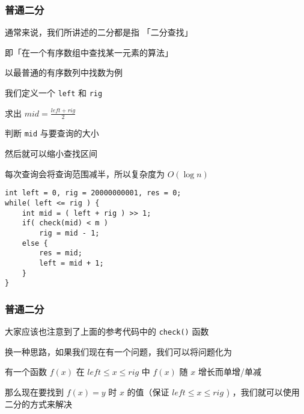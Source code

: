 \documentclass[10pt]{beamer}
\begin{document}
	\begin{frame}[fragile]
		\frametitle{普通二分}
		通常来说，我们所讲述的二分都是指 「二分查找」

		即「在一个有序数组中查找某一元素的算法」

		\pause

		以最普通的有序数列中找数为例

		我们定义一个 \texttt{left} 和 \texttt{rig}

		求出 $ mid = \frac{left + rig}{2} $

		\pause

		判断 \texttt{mid} 与要查询的大小

		然后就可以缩小查找区间

		每次查询会将查询范围减半，所以复杂度为 $O(\log n)$

		\pause

		\begin{lstlisting}[title=参考代码, frame=shadowbox]
int left = 0, rig = 20000000001, res = 0;
while( left <= rig ) {
    int mid = ( left + rig ) >> 1;
    if( check(mid) < m )
        rig = mid - 1;
    else {
        res = mid;
        left = mid + 1;
    }
}\end{lstlisting}
	\end{frame}
	\begin{frame}
		\frametitle{普通二分}
		大家应该也注意到了上面的参考代码中的 \texttt{check()} 函数

		换一种思路，如果我们现在有一个问题，我们可以将问题化为 

		\pause

		有一个函数 $f(x)$ 在 $ left \leq x \leq rig $ 中 $f(x)$ 随 $x$ 增长而单增/单减

		\pause

		那么现在要找到 $ f(x) = y$ 时 $x$ 的值（保证 $ left \leq x \leq rig $ ) ，我们就可以使用二分的方式来解决
	\end{frame}
\end{document}

